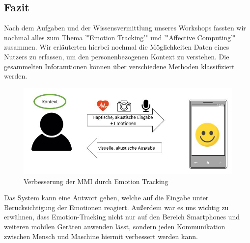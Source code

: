 \subsection{Fazit}

Nach dem Aufgaben und der Wissensvermittlung unseres Workshops fassten wir nochmal alles zum Thema '"Emotion Tracking'" und '"Affective Computing'" zusammen. Wir erläuterten hierbei nochmal die Möglichkeiten Daten eines Nutzers zu erfassen, um den personenbezogenen Kontext zu verstehen. Die gesammelten Inforamtionen können über verschiedene Methoden klassifiziert werden.

\begin{figure}[!h]
	\centering
	\includegraphics[width=0.9\linewidth]{Pictures/Fazit_Grafik}
	\caption[Verbesserung der MMI durch Emotion Tracking]{Verbesserung der MMI durch Emotion Tracking}
	\label{fig:fazitgrafik}
\end{figure}

Das System kann eine Antwort geben, welche auf die Eingabe unter Berücksichtigung der Emotionen reagiert. Außerdem war es uns wichtig zu erwähnen, dass Emotion-Tracking nicht nur auf den Bereich Smartphones und weiteren mobilen Geräten anwenden lässt, sondern jeden Kommunikation zwischen Mensch und Maschine hiermit verbessert werden kann. 
